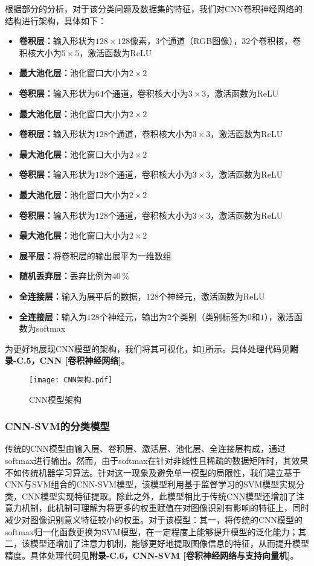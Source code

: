 \documentclass{MathorCupmodeling}
\begin{document}
	根据\textcolor{blue}{}部分的分析，对于该分类问题及数据集的特征，我们对CNN卷积神经网络的结构进行架构，具体如下：
	\begin{itemize}
		\item \textbf{卷积层：}输入形状为$128\times 128$像素，$3$个通道（RGB图像），$32$个卷积核，卷积核大小为$5\times 5$，激活函数为ReLU
		\item \textbf{最大池化层：}池化窗口大小为$2\times 2$
		\item \textbf{卷积层：}输入形状为$64$个通道，卷积核大小为$3\times 3$，激活函数为ReLU
		\item \textbf{最大池化层：}池化窗口大小为$2\times 2$
		\item \textbf{卷积层：}输入形状为$128$个通道，卷积核大小为$3\times 3$，激活函数为ReLU
		\item \textbf{最大池化层：}池化窗口大小为$2\times 2$
		\item \textbf{卷积层：}输入形状为$128$个通道，卷积核大小为$3\times 3$，激活函数为ReLU
		\item \textbf{最大池化层：}池化窗口大小为$2\times 2$
		\item \textbf{卷积层：}输入形状为$128$个通道，卷积核大小为$3\times 3$，激活函数为ReLU
		\item \textbf{最大池化层：}池化窗口大小为$2\times 2$
		\item \textbf{展平层：}将卷积层的输出展平为一维数组
		\item \textbf{随机丢弃层：}丢弃比例为$40\,\%$
		\item \textbf{全连接层：}输入为展平后的数据，$128$个神经元，激活函数为ReLU
		\item \textbf{全连接层：}输入为$128$个神经元，输出为$2$个类别（类别标签为$0$和$1$），激活函数为softmax
	\end{itemize}
	
	为更好地展现CNN模型的架构，我们将其可视化，如\textcolor{blue}{\cref{fig:CNN模型架构}}所示。具体处理代码见\textbf{附录-C.5，CNN [卷积神经网络]}。
	\begin{figure}[H]
		\centering
		\texttt{[image: CNN架构.pdf]}
		\caption{CNN模型架构}
		\label{fig:CNN模型架构}
	\end{figure}
	\subsubsection{CNN-SVM的分类模型}
	传统的CNN模型由输入层、卷积层、激活层、池化层、全连接层构成，通过softmax进行输出。然而，由于softmax在针对非线性且稀疏的数据矩阵时，其效果不如传统机器学习算法\textcolor{blue}{\cite{ZHANGP}}。针对这一现象及避免单一模型的局限性，我们建立基于CNN与SVM组合的CNN-SVM模型，该模型利用基于监督学习的SVM模型实现分类，CNN模型实现特征提取。除此之外，此模型相比于传统CNN模型还增加了注意力机制\textcolor{blue}{\cite{李毅泉}}，此机制可理解为将更多的权重赋值在对图像识别有影响的特征上，同时减少对图像识别意义特征较小的权重。对于该模型：其一，将传统的CNN模型的softmax归一化函数更换为SVM模型，在一定程度上能够提升模型的泛化能力\textcolor{blue}{\cite{何铠}}；其二，该模型还增加了注意力机制，能够更好地提取图像信息的特征，从而提升模型精度。具体处理代码见\textbf{附录-C.6，CNN-SVM [卷积神经网络与支持向量机]}。
\end{document}
